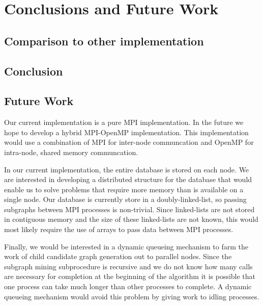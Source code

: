 \section{Conclusions and Future Work}
\label{sec:conclusions}

\subsection{Comparison to other implementation}
\label{subsec:comparison}

\subsection{Conclusion}
\label{subsec:conclusions}

\subsection{Future Work}
\label{subsec:future}

Our current implementation is a pure MPI implementation. In the future we
hope to develop a hybrid MPI-OpenMP implementation. This implementation
would use a combination of MPI for inter-node communcation and OpenMP
for intra-node, shared memory communcation.

In our current implementation, the entire database is stored on each node.
We are interested in developing a distributed structure for the database that
would enable us to solve problems that require more memory than is available
on a single node. Our database is currently store in a doubly-linked-list, so
passing subgraphs between MPI processes is non-trivial. Since
linked-lists are not stored in contiguous memory and the size of these
linked-lists are not known, this would most likely require the use of arrays
to pass data between MPI processes.

Finally, we would be interested in a dynamic queueing mechanism to farm
the work of child candidate graph generation out to parallel nodes. Since
the subgraph mining subprocedure is recursive and we do not know how many
calls are necessary for completion at the beginning of the algorithm it is
possible that one process can take much longer than other processes to
complete. A dynamic queueing mechanism would avoid this problem by giving work
to idling processes.
